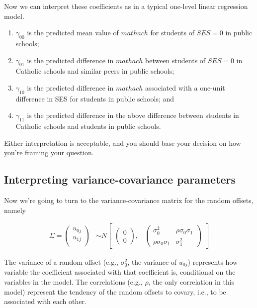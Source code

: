 \documentclass[
  letterpaper,
  DIV=11,
  numbers=noendperiod]{scrreprt}
\begin{document}
Now we can interpret these coefficients as in a typical one-level linear
regression model.

\begin{enumerate}
\def\labelenumi{\arabic{enumi}.}
\item
  \(\gamma_{00}\) is the predicted mean value of \(mathach\) for
  students of \(SES = 0\) in public schools;
\item
  \(\gamma_{01}\) is the predicted difference in \(mathach\) between
  students of \(SES = 0\) in Catholic schools and similar peers in
  public schools;
\item
  \(\gamma_{10}\) is the predicted difference in \(mathach\) associated
  with a one-unit difference in SES for students in public schools; and
\item
  \(\gamma_{11}\) is the predicted difference in the above difference
  between students in Catholic schools and students in public schools.
\end{enumerate}

Either interpretation is acceptable, and you should base your decision
on how you're framing your question.

\subsection*{Interpreting variance-covariance
parameters}\label{interpreting-variance-covariance-parameters}

Now we're going to turn to the variance-covariance matrix for the random
offsets, namely

\[\begin{aligned}
\Sigma = \begin{pmatrix}
u_{0j}\\
u_{1j}\\
\end{pmatrix} &\sim  N
\begin{bmatrix}
\begin{pmatrix}
0\\
0
\end{pmatrix}\!\!,&
\begin{pmatrix}
\sigma^2_0 & \rho\sigma_0\sigma_1\\
\rho\sigma_0\sigma_1 & \sigma^2_1
\end{pmatrix}
\end{bmatrix}
\end{aligned}\]

The variance of a random offset (e.g., \(\sigma_0^2\), the variance of
\(u_{0j}\)) represents how variable the coefficient associated with that
coefficient is, conditional on the variables in the model. The
correlations (e.g., \(\rho\), the only correlation in this model)
represent the tendency of the random offsets to covary, i.e., to be
associated with each other.
\end{document}
